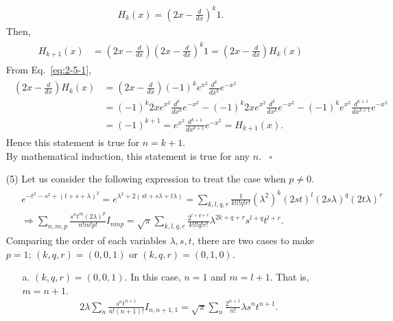 \documentclass[floatfix,nofootinbib,superscriptaddress,fleqn]{revtex4-2}
\begin{document}
\begin{itemize}
\begin{align}
  H_k(x) = \left(2x-\frac{d}{dx}\right)^k 1.
\end{align}
Then,
\begin{align}
  \begin{split}
    H_{k+1}(x) &= \left(2x-\frac{d}{dx}\right)
    \left(2x-\frac{d}{dx}\right)^k 1
    =\left(2x-\frac{d}{dx}\right)H_k(x)
  \end{split}
\end{align}
From Eq.~\eqref{eq:2-5-1},
\begin{align}
  \begin{split}
    \left(2x-\frac{d}{dx}\right)H_k(x)
    &=\left(2x-\frac{d}{dx}\right)(-1)^ke^{x^2}
    \frac{d^k}{dx^k}e^{-x^2}  \\
    &=(-1)^k 2x e^{x^2}\frac{d^k}{dx^k}e^{-x^2}
    -(-1)^k 2x e^{x^2}\frac{d^k}{dx^k}e^{-x^2}
    -(-1)^k e^{x^2}\frac{d^{k+1}}{dx^{k+1}}e^{-x^2}  \\
    &=(-1)^{k+1}= e^{x^2}\frac{d^{k+1}}{dx^{k+1}}e^{-x^2}
    =H_{k+1}(x).
  \end{split}
\end{align}
Hence this statement is true for $n=k+1$. \\
By mathematical induction, 
this statement is true for any $n$. ~\hfill $\square$
\item[(5)] Let us consider the following expression to treat the case when $p \neq 0$.
\begin{align}
  \begin{split}
    &e^{-t^2-s^2+(t+s+\lambda)^2}
    =e^{\lambda^2+2(st+s\lambda+t\lambda)} = \sum_{k,l,q,r}\frac{1}{k!l!q!r!}
    (\lambda^2)^{k}(2st)^{l}(2s\lambda)^{q}(2t\lambda)^{r}  \\
    &\Longrightarrow \sum_{n,m,p}\frac{s^nt^m(2\lambda)^p}{n!m!p!}I_{nmp}
    =\sqrt{\pi}\sum_{k,l,q,r}\frac{2^{l+q+r}}{k!l!q!r!}\lambda^{2k+q+r}s^{l+q}t^{l+r}.
  \end{split}
\end{align}
Comparing the order of each variables $\lambda,s,t$, there are two cases to make $p=1$;
$(k,q,r) = (0, 0, 1)$ or $(k,q,r) = (0, 1, 0)$.
\begin{itemize}
  \item[a. ]$(k,q,r) = (0, 0, 1)$.
  In this case, $n=1$ and $m=l+1$. That is, $m=n+1$.
  \begin{align}
    2\lambda\sum_n \frac{s^n t^{n+1}}{n!(n+1)!}I_{n,n+1,1}
    =\sqrt{\pi}\sum_{n}\frac{2^{n+1}}{n!}\lambda s^n t^{n+1}.
  \end{align}

\end{itemize}
\end{itemize}
\end{document}

